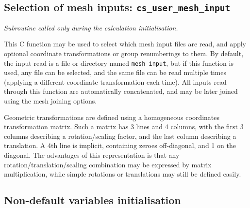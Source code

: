 {{{\subsection{Selection of mesh inputs: \textmd{\texttt{cs\_user\_mesh\_input}}}

\noindent
\textit{Subroutine called only during the calculation initialisation.}

This C function may be used to select which mesh input files
are read, and apply optional coordinate transformations or group renumberings
to them. By default, the input read is a file or directory named
\texttt{mesh\_input}, but if this function is used, any file can be selected,
and the same file can be read multiple times (applying a different
coordinate transformation each time).
All inputs read through this function are automatically concatenated, and
may be later joined using the mesh joining options.

Geometric transformations are defined using a homogeneous coordinates
transformation matrix. Such a matrix has 3 lines and 4 columns, with the
first 3 columns describing a rotation/scaling factor, and the last column
describing a translation. A 4th line is implicit, containing zeroes
off-diagonal, and 1 on the diagonal. The advantages of this representation
is that any rotation/translation/scaling combination may be expressed
by matrix multiplication, while simple rotations or translations
may still be defined easily.

\subsection{Non-default variables initialisation} \label{sec:cs_user_initialization}

}}}
